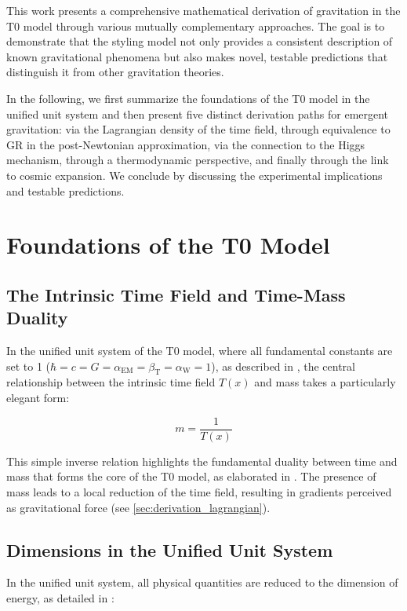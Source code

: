 \documentclass[12pt,a4paper]{article}
\newcommand{\Tfield}{T(x)}
\newcommand{\betaT}{\beta_{\text{T}}}
\newcommand{\alphaEM}{\alpha_{\text{EM}}}
\newcommand{\alphaW}{\alpha_{\text{W}}}
\begin{document}
	This work presents a comprehensive mathematical derivation of gravitation in the T0 model through various mutually complementary approaches. The goal is to demonstrate that the styling model not only provides a consistent description of known gravitational phenomena but also makes novel, testable predictions that distinguish it from other gravitation theories.
	
	In the following, we first summarize the foundations of the T0 model in the unified unit system and then present five distinct derivation paths for emergent gravitation: via the Lagrangian density of the time field, through equivalence to GR in the post-Newtonian approximation, via the connection to the Higgs mechanism, through a thermodynamic perspective, and finally through the link to cosmic expansion. We conclude by discussing the experimental implications and testable predictions.
	
	\section{Foundations of the T0 Model}
	\label{sec:foundations}
	
	\subsection{The Intrinsic Time Field and Time-Mass Duality}
	\label{subsec:intrinsic_time}
	In the unified unit system of the T0 model, where all fundamental constants are set to 1 (\(\hbar = c = G = \alphaEM = \betaT = \alphaW = 1\)), as described in \cite{pascher_alpha_2025,pascher_alphabeta_2025}, the central relationship between the intrinsic time field \(\Tfield\) and mass takes a particularly elegant form:
	
	\begin{equation}
		\label{eq:mass_time_relation}
		m = \frac{1}{\Tfield}
	\end{equation}
	
	This simple inverse relation highlights the fundamental duality between time and mass that forms the core of the T0 model, as elaborated in \cite{pascher_lagrange_2025}. The presence of mass leads to a local reduction of the time field, resulting in gradients perceived as gravitational force (see \cref{sec:derivation_lagrangian}).
	
	\subsection{Dimensions in the Unified Unit System}
	\label{subsec:dimensions}
	In the unified unit system, all physical quantities are reduced to the dimension of energy, as detailed in \cite{pascher_alphabeta_2025}:
	
\end{document}
